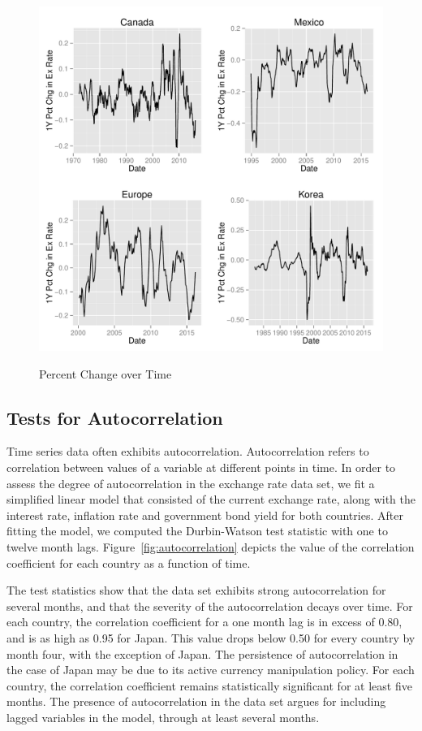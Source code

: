 \documentclass{sig-alternate-05-2015}
\begin{document}
\begin{figure}
\centering
\caption{Percent Change over Time}
\includegraphics[scale=0.45]{rates_over_time.pdf}
\label{fig:rates_time}
\end{figure}

\subsection{Tests for Autocorrelation}
Time series data often exhibits autocorrelation. Autocorrelation refers to correlation between values of a variable at different points in time. In order to assess the degree of autocorrelation in the exchange rate data set, we fit a simplified linear model that consisted of the current exchange rate, along with the interest rate, inflation rate and government bond yield for both countries. After fitting the model, we computed the Durbin-Watson test statistic with one to twelve month lags. Figure~\ref{fig:autocorrelation} depicts the value of the correlation coefficient for each country as a function of time.
\par{} The test statistics show that the data set exhibits strong autocorrelation for several months, and that the severity of the autocorrelation decays over time. For each country, the correlation coefficient for a one month lag is in excess of 0.80, and is as high as 0.95 for Japan. This value drops below 0.50 for every country by month four, with the exception of Japan. The persistence of autocorrelation in the case of Japan may be due to its active currency manipulation policy. For each country, the correlation coefficient remains statistically significant for at least five months. The presence of autocorrelation in the data set argues for including lagged variables in the model, through at least several months.
\end{document}
